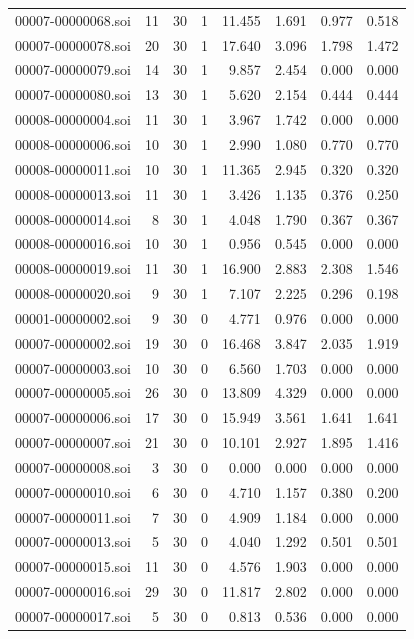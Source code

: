 \begin{tabular}{lrrrrrrr}
00007-00000068.soi & 11 & 30 & 1 & 11.455 & 1.691 & 0.977 & 0.518 \\
00007-00000078.soi & 20 & 30 & 1 & 17.640 & 3.096 & 1.798 & 1.472 \\
00007-00000079.soi & 14 & 30 & 1 & 9.857 & 2.454 & 0.000 & 0.000 \\
00007-00000080.soi & 13 & 30 & 1 & 5.620 & 2.154 & 0.444 & 0.444 \\
00008-00000004.soi & 11 & 30 & 1 & 3.967 & 1.742 & 0.000 & 0.000 \\
00008-00000006.soi & 10 & 30 & 1 & 2.990 & 1.080 & 0.770 & 0.770 \\
00008-00000011.soi & 10 & 30 & 1 & 11.365 & 2.945 & 0.320 & 0.320 \\
00008-00000013.soi & 11 & 30 & 1 & 3.426 & 1.135 & 0.376 & 0.250 \\
00008-00000014.soi & 8 & 30 & 1 & 4.048 & 1.790 & 0.367 & 0.367 \\
00008-00000016.soi & 10 & 30 & 1 & 0.956 & 0.545 & 0.000 & 0.000 \\
00008-00000019.soi & 11 & 30 & 1 & 16.900 & 2.883 & 2.308 & 1.546 \\
00008-00000020.soi & 9 & 30 & 1 & 7.107 & 2.225 & 0.296 & 0.198 \\
00001-00000002.soi & 9 & 30 & 0 & 4.771 & 0.976 & 0.000 & 0.000 \\
00007-00000002.soi & 19 & 30 & 0 & 16.468 & 3.847 & 2.035 & 1.919 \\
00007-00000003.soi & 10 & 30 & 0 & 6.560 & 1.703 & 0.000 & 0.000 \\
00007-00000005.soi & 26 & 30 & 0 & 13.809 & 4.329 & 0.000 & 0.000 \\
00007-00000006.soi & 17 & 30 & 0 & 15.949 & 3.561 & 1.641 & 1.641 \\
00007-00000007.soi & 21 & 30 & 0 & 10.101 & 2.927 & 1.895 & 1.416 \\
00007-00000008.soi & 3 & 30 & 0 & 0.000 & 0.000 & 0.000 & 0.000 \\
00007-00000010.soi & 6 & 30 & 0 & 4.710 & 1.157 & 0.380 & 0.200 \\
00007-00000011.soi & 7 & 30 & 0 & 4.909 & 1.184 & 0.000 & 0.000 \\
00007-00000013.soi & 5 & 30 & 0 & 4.040 & 1.292 & 0.501 & 0.501 \\
00007-00000015.soi & 11 & 30 & 0 & 4.576 & 1.903 & 0.000 & 0.000 \\
00007-00000016.soi & 29 & 30 & 0 & 11.817 & 2.802 & 0.000 & 0.000 \\
00007-00000017.soi & 5 & 30 & 0 & 0.813 & 0.536 & 0.000 & 0.000 \\

\end{tabular}

